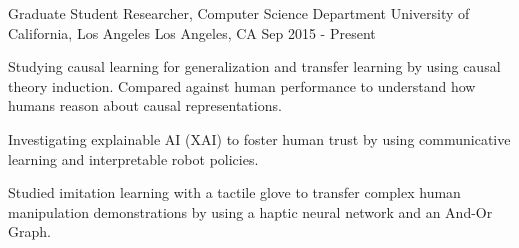 


\begin{cventries}


\cventry
{Graduate Student Researcher, Computer Science Department}
{University of California, Los Angeles}
{Los Angeles, CA}
{Sep 2015 - Present}
{
\begin{cvitems}
\item Studying causal learning for generalization and transfer learning by using causal theory induction. Compared against human performance to understand how humans reason about causal representations.
\item Investigating explainable AI (XAI) to foster human trust by using communicative learning and interpretable robot policies.
\item Studied imitation learning with a tactile glove to transfer complex human manipulation demonstrations by using a haptic neural network and an And-Or Graph.
\end{cvitems}
}



\end{cventries}